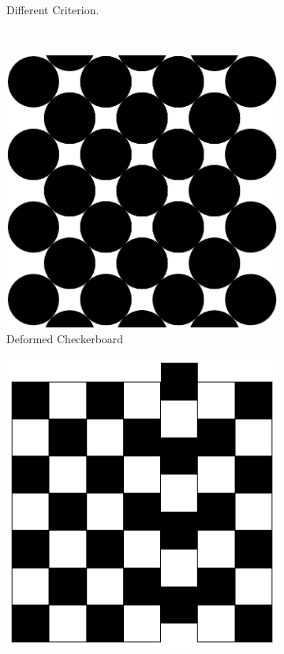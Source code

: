 \documentclass[
  oneside,
  11pt, a4paper,
  footinclude=true,
  headinclude=true,
  cleardoublepage=empty
]{scrbook}
\begin{document}
\begin{figure}[H]
\begin{subfigure}[t]{0.4\textwidth}
    \caption{Different Criterion.}
    \label{fig:critchecker}
\end{subfigure}
  \hspace*{\fill}\\
  \hspace*{\fill}
  \begin{subfigure}[t]{0.4\textwidth}
  	\includegraphics[width=\textwidth]{CheckerboardCircles}
      \caption{Deformed Checkerboard}
      \label{fig:deformedchecker}
  \end{subfigure}
      \hspace*{\fill} 
\begin{subfigure}[t]{0.4\textwidth}
	\includegraphics[width=\textwidth]{CheckerboardAperiodic}

\end{subfigure}
\end{figure}
\end{document}

